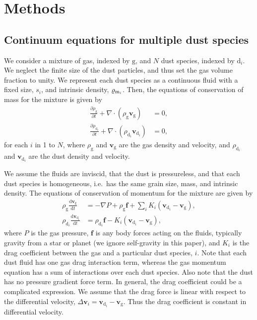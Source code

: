 \documentclass[fleqn,usenatbib]{mnras}
\newcommand{\g}{\mathrm{g}}
\newcommand{\dd}{\mathrm{d}}
\let\vec\bm
\begin{document}
\section{Methods}

\subsection{Continuum equations for multiple dust species}%
\label{subsec:continuum}

We consider a mixture of gas, indexed by \(\g\), and \(N\) dust species, indexed
by \(\dd_i\). We neglect the finite size of the dust particles, and thus set the
gas volume fraction to unity. We represent each dust species as a continuous
fluid with a fixed size, \(s_i\), and intrinsic density, \(\varrho_{{\rm
m}_i}\). Then, the equations of conservation of mass for the mixture is given by
%
\begin{align}
   \label{eqn:conserve-gas-mass}
   \frac{\partial \rho_{\g}}{\partial t} + \nabla \cdot (\rho_{\g} \vec{v}_{\g}) &= 0, \\
   \label{eqn:conserve-dust-mass}
   \frac{\partial \rho_{\dd_i}}{\partial t} + \nabla \cdot (\rho_{\dd_i} \vec{v}_{\dd_i}) &= 0,
\end{align}
%
for each \(i\) in 1 to \(N\), where \(\rho_{\g}\) and \(\vec{v}_{\g}\) are the gas
density and velocity, and \(\rho_{\dd_i}\) and \(\vec{v}_{\dd_i}\) are the dust
density and velocity.

We assume the fluids are inviscid, that the dust is pressureless, and that each
dust species is homogeneous, i.e.\ has the same grain size, mass, and intrinsic
density. The equations of conservation of momentum for the mixture are given by
%
\begin{align}
   \rho_{\g} \frac{\dd \vec{v}_{\g}}{\dd t}
      &= - \nabla P + \rho_{\g} \vec{f} + \sum_i K_i \left(\vec{v}_{\dd_i}
         - \vec{v}_{\g}\right), \\
   \rho_{\dd_i} \frac{\dd \vec{v}_{\dd_i}}{\dd t}
      &= \rho_{\dd_i} \vec{f} - K_i \left(\vec{v}_{\dd_i} - \vec{v}_{\g}\right),
\end{align}
%
where \(P\) is the gas pressure, \(\vec{f}\) is any body forces acting on the
fluids, typically gravity from a star or planet (we ignore self-gravity in this
paper), and \(K_i\) is the drag coefficient between the gas and a particular
dust species, \(i\). Note that each dust fluid has one gas drag interaction
term, whereas the gas momentum equation has a sum of interactions over each dust
species. Also note that the dust has no pressure gradient force term. In
general, the drag coefficient could be a complicated expression. We assume that
the drag force is linear with respect to the differential velocity, \(\Delta
\vec{v}_i = \vec{v}_{\dd_i} - \vec{v}_{\g} \). Thus the drag coefficient is
constant in differential velocity.
\end{document}
